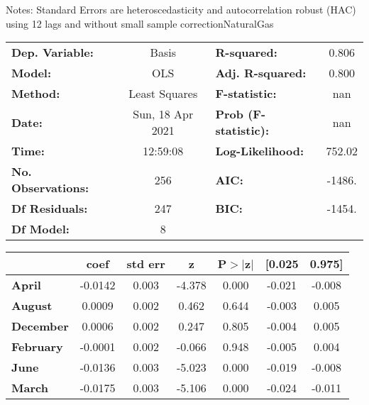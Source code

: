 Notes: \newline
 [1] Standard Errors are heteroscedasticity and autocorrelation robust (HAC) using 12 lags and without small sample correctionNaturalGas\begin{center}
\begin{tabular}{lclc}
\toprule
\textbf{Dep. Variable:}    &      Basis       & \textbf{  R-squared:         } &     0.806   \\
\textbf{Model:}            &       OLS        & \textbf{  Adj. R-squared:    } &     0.800   \\
\textbf{Method:}           &  Least Squares   & \textbf{  F-statistic:       } &       nan   \\
\textbf{Date:}             & Sun, 18 Apr 2021 & \textbf{  Prob (F-statistic):} &      nan    \\
\textbf{Time:}             &     12:59:08     & \textbf{  Log-Likelihood:    } &    752.02   \\
\textbf{No. Observations:} &         256      & \textbf{  AIC:               } &    -1486.   \\
\textbf{Df Residuals:}     &         247      & \textbf{  BIC:               } &    -1454.   \\
\textbf{Df Model:}         &           8      & \textbf{                     } &             \\
\bottomrule
\end{tabular}
\begin{tabular}{lcccccc}
                  & \textbf{coef} & \textbf{std err} & \textbf{z} & \textbf{P$> |$z$|$} & \textbf{[0.025} & \textbf{0.975]}  \\
\midrule
\textbf{April}    &      -0.0142  &        0.003     &    -4.378  &         0.000        &       -0.021    &       -0.008     \\
\textbf{August}   &       0.0009  &        0.002     &     0.462  &         0.644        &       -0.003    &        0.005     \\
\textbf{December} &       0.0006  &        0.002     &     0.247  &         0.805        &       -0.004    &        0.005     \\
\textbf{February} &      -0.0001  &        0.002     &    -0.066  &         0.948        &       -0.005    &        0.004     \\
\textbf{June}     &      -0.0136  &        0.003     &    -5.023  &         0.000        &       -0.019    &       -0.008     \\
\textbf{March}    &      -0.0175  &        0.003     &    -5.106  &         0.000        &       -0.024    &       -0.011     \\

\end{tabular}
\end{center}

